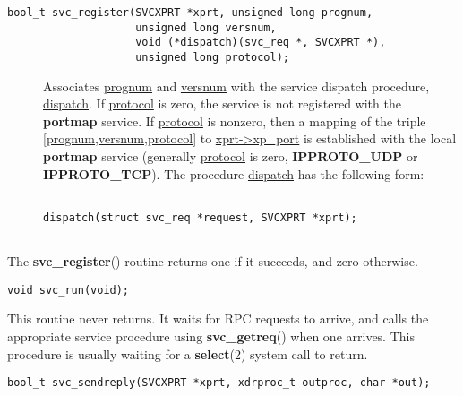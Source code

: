 \documentclass[]{article}
\let\realtextbf=\textbf
\renewcommand{\textbf}[1]{\textcolor{boldcolor}{\realtextbf{#1}}}
\renewcommand{\emph}[1]{\underline{#1}}
\begin{document}
\begin{verbatim}
bool_t svc_register(SVCXPRT *xprt, unsigned long prognum,
                    unsigned long versnum,
                    void (*dispatch)(svc_req *, SVCXPRT *),
                    unsigned long protocol);
\end{verbatim}

\begin{description}
\item[]
Associates \emph{prognum} and \emph{versnum} with the service dispatch
procedure, \emph{dispatch}. If \emph{protocol} is zero, the service is
not registered with the \textbf{portmap} service. If \emph{protocol} is
nonzero, then a mapping of the triple
{[}\emph{prognum},\emph{versnum},\emph{protocol}{]} to
\emph{xprt-\textgreater{}xp\_port} is established with the local
\textbf{portmap} service (generally \emph{protocol} is zero,
\textbf{IPPROTO\_UDP} or \textbf{IPPROTO\_TCP}). The procedure
\emph{dispatch} has the following form: \\

\begin{verbatim}

dispatch(struct svc_req *request, SVCXPRT *xprt);
    
\end{verbatim}
\end{description}

\begin{description}
\itemsep1pt\parskip0pt
\item[]
The \textbf{svc\_register}() routine returns one if it succeeds, and
zero otherwise.
\end{description}

\begin{verbatim}
void svc_run(void);
\end{verbatim}

\begin{description}
\itemsep1pt\parskip0pt
\item[]
This routine never returns. It waits for RPC requests to arrive, and
calls the appropriate service procedure using \textbf{svc\_getreq}()
when one arrives. This procedure is usually waiting for a
\textbf{select}(2) system call to return.
\end{description}

\begin{verbatim}
bool_t svc_sendreply(SVCXPRT *xprt, xdrproc_t outproc, char *out);
\end{verbatim}
\end{document}
